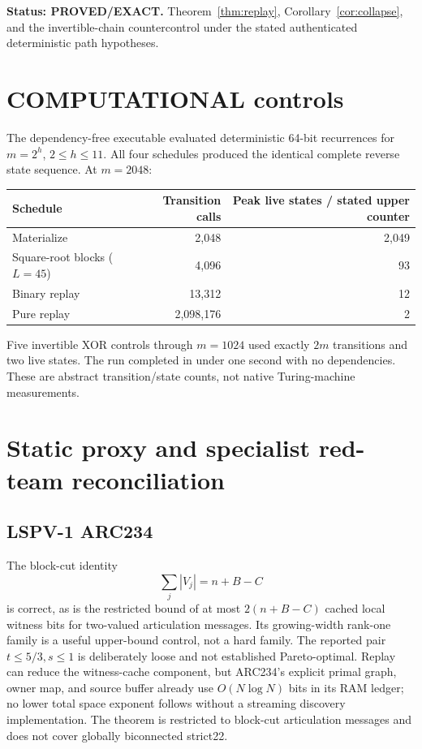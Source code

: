 \documentclass[11pt]{article}
\newcommand{\Status}[1]{\textbf{Status: #1.}}
\begin{document}
\Status{PROVED/EXACT} Theorem~\ref{thm:replay}, Corollary~\ref{cor:collapse}, and the invertible-chain
countercontrol under the stated authenticated deterministic path hypotheses.

\section{COMPUTATIONAL controls}

The dependency-free executable evaluated deterministic 64-bit recurrences for
$m=2^h$, $2\le h\le11$.  All four schedules produced the identical complete reverse state sequence.
At $m=2048$:
\begin{center}
\begin{tabular}{lrr}
\toprule
Schedule & Transition calls & Peak live states / stated upper counter\\
\midrule
Materialize & 2,048 & 2,049\\
Square-root blocks ($L=45$) & 4,096 & 93\\
Binary replay & 13,312 & 12\\
Pure replay & 2,098,176 & 2\\
\bottomrule
\end{tabular}
\end{center}
Five invertible XOR controls through $m=1024$ used exactly $2m$ transitions and two live states.
The run completed in under one second with no dependencies.  These are abstract transition/state
counts, not native Turing-machine measurements.

\section{Static proxy and specialist red-team reconciliation}

\subsection{LSPV-1 ARC234}

The block-cut identity
\[
\sum_j|V_j|=n+B-C
\]
is correct, as is the restricted bound of at most $2(n+B-C)$ cached local witness bits for two-valued
articulation messages.  Its growing-width rank-one family is a useful upper-bound control, not a hard
family.  The reported pair $t\le5/3,s\le1$ is deliberately loose and not established Pareto-optimal.
Replay can reduce the witness-cache component, but ARC234's explicit primal graph, owner map, and
source buffer already use $O(N\log N)$ bits in its RAM ledger; no lower total space exponent follows
without a streaming discovery implementation.  The theorem is restricted to block-cut articulation
messages and does not cover globally biconnected strict22.
\end{document}
